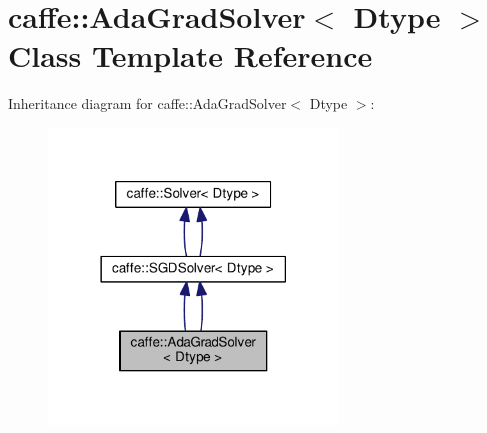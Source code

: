\hypertarget{classcaffe_1_1_ada_grad_solver}{}\section{caffe\+:\+:Ada\+Grad\+Solver$<$ Dtype $>$ Class Template Reference}
\label{classcaffe_1_1_ada_grad_solver}


Inheritance diagram for caffe\+:\+:Ada\+Grad\+Solver$<$ Dtype $>$\+:
\nopagebreak
\begin{figure}[H]
\begin{center}
\leavevmode
\includegraphics[width=218pt]{classcaffe_1_1_ada_grad_solver__inherit__graph}
\end{center}
\end{figure}
